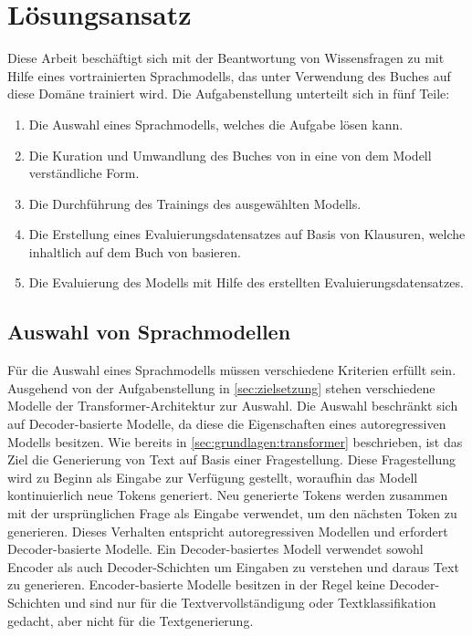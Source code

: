 \chapter{Lösungsansatz}\label{ch:approach}
Diese Arbeit beschäftigt sich mit der Beantwortung von Wissensfragen zu \citet{bb} mit Hilfe eines vortrainierten Sprachmodells,
das unter Verwendung des Buches \citet{bb} auf diese Domäne trainiert wird.
Die Aufgabenstellung unterteilt sich in fünf Teile:
\begin{enumerate}
    \item Die Auswahl eines Sprachmodells, welches die Aufgabe lösen kann.
    \item Die Kuration und Umwandlung des Buches von \citet{bb} in eine von dem Modell verständliche Form.
    \item Die Durchführung des Trainings des ausgewählten Modells.
    \item Die Erstellung eines Evaluierungsdatensatzes auf Basis von Klausuren, welche inhaltlich auf dem Buch von \citet{bb} basieren.
    \item Die Evaluierung des Modells mit Hilfe des erstellten Evaluierungsdatensatzes.
\end{enumerate}

\section{Auswahl von Sprachmodellen}
Für die Auswahl eines Sprachmodells müssen verschiedene Kriterien erfüllt sein.
Ausgehend von der Aufgabenstellung in \cref{sec:zielsetzung} stehen verschiedene Modelle der Transformer-Architektur zur Auswahl.
Die Auswahl beschränkt sich auf Decoder-basierte Modelle, da diese die Eigenschaften eines autoregressiven Modells besitzen.
Wie bereits in \cref{sec:grundlagen:transformer} beschrieben, ist das Ziel die Generierung von Text auf Basis einer Fragestellung.
Diese Fragestellung wird zu Beginn als Eingabe zur Verfügung gestellt, woraufhin das Modell kontinuierlich neue Tokens generiert.
Neu generierte Tokens werden zusammen mit der ursprünglichen Frage als Eingabe verwendet, um den nächsten Token zu generieren.
Dieses Verhalten entspricht autoregressiven Modellen und erfordert Decoder-basierte Modelle.
Ein Decoder-basiertes Modell verwendet sowohl Encoder als auch Decoder-Schichten um Eingaben zu verstehen und daraus Text zu generieren.
Encoder-basierte Modelle besitzen in der Regel keine Decoder-Schichten und sind nur für die Textvervollständigung oder Textklassifikation gedacht, aber nicht für die Textgenerierung.\\

